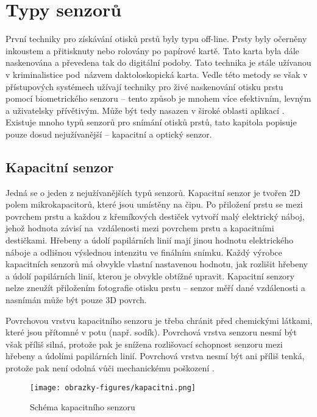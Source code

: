 \section{Typy senzorů}
První techniky pro získávání otisků prstů byly typu off-line. Prsty byly očerněny inkoustem a přitisknuty nebo rolovány po papírové kartě. Tato karta byla dále naskenována a převedena tak do digitální podoby. Tato technika je stále užívanou v kriminalistice pod~názvem daktoloskopická karta. Vedle této metody se však v přístupových systémech užívají techniky pro živé naskenování otisku prstu pomocí biometrického senzoru -- tento způsob je mnohem více efektivním, levným a uživatelsky přívětivým. Může být tedy nasazen v široké oblasti aplikací \cite{Maltoni2009}. Existuje mnoho typů senzorů pro snímání otisků prstů, tato kapitola popisuje pouze dosud nejužívanější -- kapacitní a optický senzor.

\subsection*{Kapacitní senzor}
Jedná se o jeden z nejužívanějších typů senzorů. Kapacitní senzor je tvořen 2D polem mikrokapacitorů, které jsou umístěny na čipu. Po přiložení prstu se mezi povrchem prstu a každou z křemíkových destiček vytvoří malý elektrický náboj, jehož hodnota závisí na~vzdálenosti mezi povrchem prstu a kapacitními destičkami. Hřebeny a údolí papilárních linií mají jinou hodnotu elektrického náboje a odlišnou výslednou intenzitu ve finálním snímku. Každý výrobce kapacitních senzorů má obvykle vlastní nastavenou hodnotu, jak rozlišit hřebeny a údolí papilárních linií, kterou je obvykle obtížné upravit. Kapacitní senzory nelze zneužít přiložením fotografie otisku prstu -- senzor měří dané vzdálenosti a nasnímán může být pouze 3D povrch. 

Povrchovou vrstvu kapacitního senzoru je třeba chránit před chemickými látkami, které jsou přítomné v potu (např. sodík). Povrchová vrstva senzoru nesmí být však příliš silná, protože pak je snížena rozlišovací schopnost senzoru mezi hřebeny a údolími papilárních linií. Povrchová vrstva nesmí být ani příliš tenká, protože pak není odolná vůči mechanickému poškození \cite{Maltoni2009}. 

\begin{figure}[!htbp]
    \centering
    \texttt{[image: obrazky-figures/kapacitni.png]}
    \caption{Schéma kapacitního senzoru \cite{Maltoni2009}}
\end{figure}

